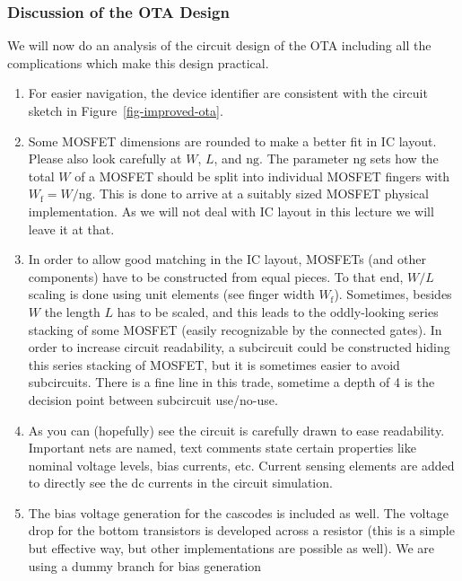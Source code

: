 \documentclass[
  a4paper,
  DIV=11,
  numbers=noendperiod]{scrartcl}
\providecommand{\tightlist}{%
  \setlength{\itemsep}{0pt}\setlength{\parskip}{0pt}}\usepackage{longtable,booktabs,array}
\begin{document}
\subsubsection{Discussion of the OTA
Design}\label{discussion-of-the-ota-design}

We will now do an analysis of the circuit design of the OTA including
all the complications which make this design practical.

\begin{enumerate}
\def\labelenumi{\arabic{enumi}.}
\tightlist
\item
  For easier navigation, the device identifier are consistent with the
  circuit sketch in Figure~\ref{fig-improved-ota}.
\item
  Some MOSFET dimensions are rounded to make a better fit in IC layout.
  Please also look carefully at \(W\), \(L\), and \(\mathrm{ng}\). The
  parameter \(\mathrm{ng}\) sets how the total \(W\) of a MOSFET should
  be split into individual MOSFET fingers with
  \(W_\mathrm{f} = W / \mathrm{ng}\). This is done to arrive at a
  suitably sized MOSFET physical implementation. As we will not deal
  with IC layout in this lecture we will leave it at that.
\item
  In order to allow good matching in the IC layout, MOSFETs (and other
  components) have to be constructed from equal pieces. To that end,
  \(W/L\) scaling is done using unit elements (see finger width
  \(W_\mathrm{f}\)). Sometimes, besides \(W\) the length \(L\) has to be
  scaled, and this leads to the oddly-looking series stacking of some
  MOSFET (easily recognizable by the connected gates). In order to
  increase circuit readability, a subcircuit could be constructed hiding
  this series stacking of MOSFET, but it is sometimes easier to avoid
  subcircuits. There is a fine line in this trade, sometime a depth of 4
  is the decision point between subcircuit use/no-use.
\item
  As you can (hopefully) see the circuit is carefully drawn to ease
  readability. Important nets are named, text comments state certain
  properties like nominal voltage levels, bias currents, etc. Current
  sensing elements are added to directly see the dc currents in the
  circuit simulation.
\item
  The bias voltage generation for the cascodes is included as well. The
  voltage drop for the bottom transistors is developed across a resistor
  (this is a simple but effective way, but other implementations are
  possible as well). We are using a dummy branch for bias generation

\end{enumerate}
\end{document}
